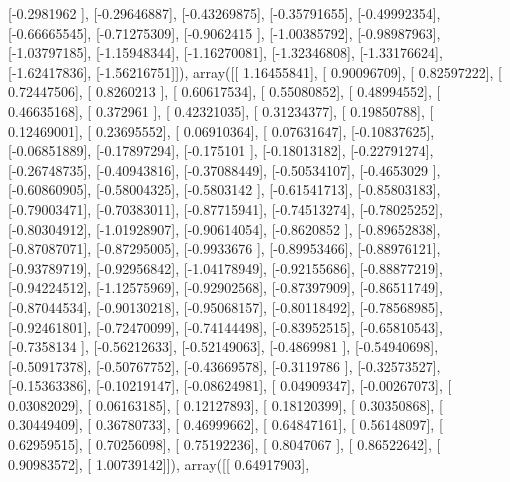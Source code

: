 \documentclass{article}
\begin{document}
       [-0.2981962 ],
       [-0.29646887],
       [-0.43269875],
       [-0.35791655],
       [-0.49992354],
       [-0.66665545],
       [-0.71275309],
       [-0.9062415 ],
       [-1.00385792],
       [-0.98987963],
       [-1.03797185],
       [-1.15948344],
       [-1.16270081],
       [-1.32346808],
       [-1.33176624],
       [-1.62417836],
       [-1.56216751]]), array([[ 1.16455841],
       [ 0.90096709],
       [ 0.82597222],
       [ 0.72447506],
       [ 0.8260213 ],
       [ 0.60617534],
       [ 0.55080852],
       [ 0.48994552],
       [ 0.46635168],
       [ 0.372961  ],
       [ 0.42321035],
       [ 0.31234377],
       [ 0.19850788],
       [ 0.12469001],
       [ 0.23695552],
       [ 0.06910364],
       [ 0.07631647],
       [-0.10837625],
       [-0.06851889],
       [-0.17897294],
       [-0.175101  ],
       [-0.18013182],
       [-0.22791274],
       [-0.26748735],
       [-0.40943816],
       [-0.37088449],
       [-0.50534107],
       [-0.4653029 ],
       [-0.60860905],
       [-0.58004325],
       [-0.5803142 ],
       [-0.61541713],
       [-0.85803183],
       [-0.79003471],
       [-0.70383011],
       [-0.87715941],
       [-0.74513274],
       [-0.78025252],
       [-0.80304912],
       [-1.01928907],
       [-0.90614054],
       [-0.8620852 ],
       [-0.89652838],
       [-0.87087071],
       [-0.87295005],
       [-0.9933676 ],
       [-0.89953466],
       [-0.88976121],
       [-0.93789719],
       [-0.92956842],
       [-1.04178949],
       [-0.92155686],
       [-0.88877219],
       [-0.94224512],
       [-1.12575969],
       [-0.92902568],
       [-0.87397909],
       [-0.86511749],
       [-0.87044534],
       [-0.90130218],
       [-0.95068157],
       [-0.80118492],
       [-0.78568985],
       [-0.92461801],
       [-0.72470099],
       [-0.74144498],
       [-0.83952515],
       [-0.65810543],
       [-0.7358134 ],
       [-0.56212633],
       [-0.52149063],
       [-0.4869981 ],
       [-0.54940698],
       [-0.50917378],
       [-0.50767752],
       [-0.43669578],
       [-0.3119786 ],
       [-0.32573527],
       [-0.15363386],
       [-0.10219147],
       [-0.08624981],
       [ 0.04909347],
       [-0.00267073],
       [ 0.03082029],
       [ 0.06163185],
       [ 0.12127893],
       [ 0.18120399],
       [ 0.30350868],
       [ 0.30449409],
       [ 0.36780733],
       [ 0.46999662],
       [ 0.64847161],
       [ 0.56148097],
       [ 0.62959515],
       [ 0.70256098],
       [ 0.75192236],
       [ 0.8047067 ],
       [ 0.86522642],
       [ 0.90983572],
       [ 1.00739142]]), array([[ 0.64917903],
\end{document}
